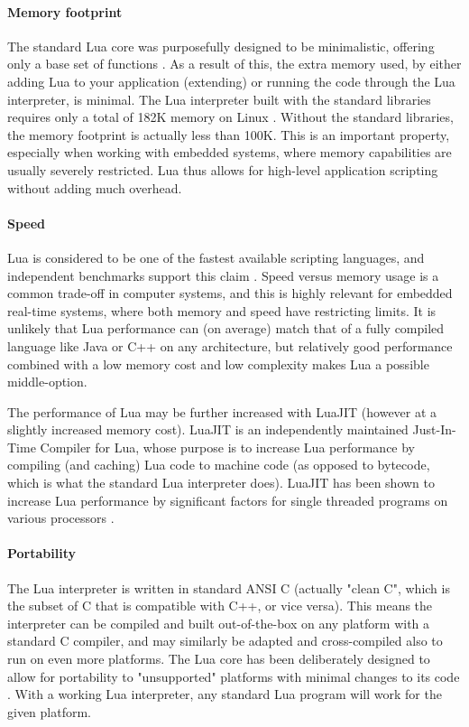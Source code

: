 \paragraph{Memory footprint}
The standard Lua core was purposefully designed to be minimalistic, offering only a base set of functions \cite{article:the_implementation_of_lua}. As a result of this, the extra memory used, by either adding Lua to your application (extending) or running the code through the Lua interpreter, is minimal. The Lua interpreter built with the standard libraries requires only a total of 182K memory on Linux \cite{website:lua_about}. Without the standard libraries, the memory footprint is actually less than 100K. This is an important property, especially when working with embedded systems, where memory capabilities are usually severely restricted. Lua thus allows for high-level application scripting without adding much overhead.

\paragraph{Speed}
Lua is considered to be one of the fastest available scripting languages, and independent benchmarks support this claim \cite{website:computer_language_benchmarks_game}. Speed versus memory usage is a common trade-off in computer systems, and this is highly relevant for embedded real-time systems, where both memory and speed have restricting limits. It is unlikely that Lua performance can (on average) match that of a fully compiled language like Java or C++ on any architecture, but relatively good performance combined with a low memory cost and low complexity makes Lua a possible middle-option.

The performance of Lua may be further increased with LuaJIT (however at a slightly increased memory cost). LuaJIT is an independently maintained Just-In-Time Compiler for Lua, whose purpose is to increase Lua performance by compiling (and caching) Lua code to machine code (as opposed to bytecode, which is what the standard Lua interpreter does). LuaJIT has been shown to increase Lua performance by significant factors for single threaded programs on various processors \cite{website:luajit_performance}. 

\paragraph{Portability}
The Lua interpreter is written in standard ANSI C (actually "clean C", which is the subset of C that is compatible with C++, or vice versa). This means the interpreter can be compiled and built out-of-the-box on any platform with a standard C compiler, and may similarly be adapted and cross-compiled also to run on even more platforms. The Lua core has been deliberately designed to allow for portability to "unsupported" platforms with minimal changes to its code \cite{chapter:porting_lua_microcontroller}. With a working Lua interpreter, any standard Lua program will work for the given platform.

